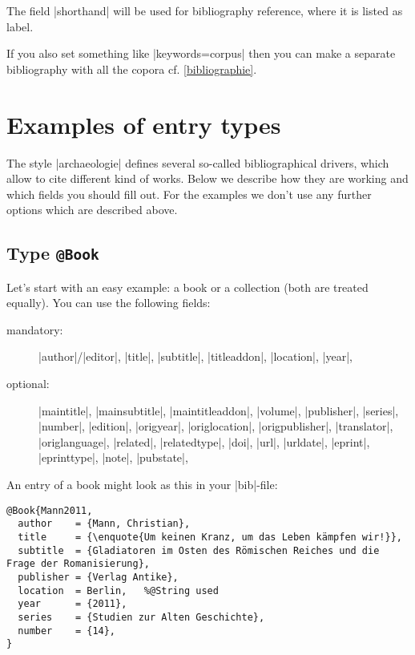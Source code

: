 \documentclass[a4paper,
10pt,
greek,
french,
spanish,
italian,
ngerman,
english
]{ltxdoc}
\begin{document}
The field |shorthand| will be used for bibliography reference,
where it is listed as label.

If you also set something like |keywords={corpus}| then you can make a separate bibliography with all the copora cf. \cref{bibliographie}.



\section{Examples of entry types}\label{beispiele}
The style |archaeologie| defines several so-called bibliographical drivers,
which allow to cite different kind of works.
Below we describe how they are working and which fields you should fill out.
For the examples we don't use any further options which are described above.

\subsection{Type \texttt{@Book}}\label{book}
Let’s start with an easy example: 
a book or a collection (both are treated equally).
You can use the following fields:
\begin{description}
\item[mandatory:] 
|author|/|editor|, 
|title|, |subtitle|, |titleaddon|,
|location|, |year|,
\item[optional:]
|maintitle|, |mainsubtitle|, |maintitleaddon|, |volume|, 
|publisher|, |series|, |number|, |edition|, 
|origyear|, |origlocation|, |origpublisher|, 
|translator|, |origlanguage|,
|related|, |relatedtype|,
|doi|, |url|, |urldate|, |eprint|, |eprinttype|, |note|, |pubstate|, 
 \end{description}
 
 
An entry of a book might look as this in your |bib|-file:
\begin{lstlisting}[style=bibentry,label=Mann2011,caption={{@}Book\{Mann2011,…\} }]
@Book{Mann2011,
  author    = {Mann, Christian},
  title     = {\enquote{Um keinen Kranz, um das Leben kämpfen wir!}},
  subtitle  = {Gladiatoren im Osten des Römischen Reiches und die Frage der Romanisierung},
  publisher = {Verlag Antike},
  location  = Berlin, 	%@String used
  year      = {2011},
  series    = {Studien zur Alten Geschichte},
  number    = {14},
}
\end{lstlisting}
\end{document}
